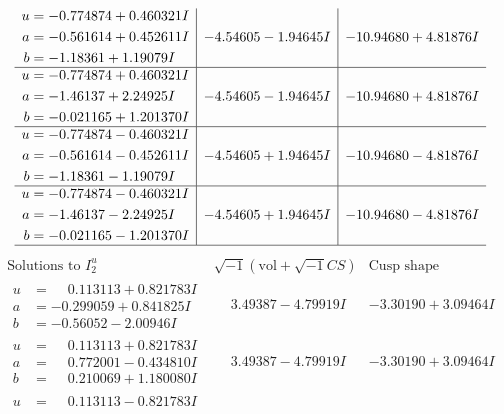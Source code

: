 \documentclass[1p]{elsarticle_modified}
\theoremstyle{definition}
\newcommand{\I}{\sqrt{-1}}
\begin{document}
$$\begin{array}{c|c|c}
\begin{aligned}
u &= -0.774874 + 0.460321 I \\
a &= -0.561614 + 0.452611 I \\
b &= -1.18361 + 1.19079 I\end{aligned}
 & -4.54605 - 1.94645 I & -10.94680 + 4.81876 I \\ \hline\begin{aligned}
u &= -0.774874 + 0.460321 I \\
a &= -1.46137 + 2.24925 I \\
b &= -0.021165 + 1.201370 I\end{aligned}
 & -4.54605 - 1.94645 I & -10.94680 + 4.81876 I \\ \hline\begin{aligned}
u &= -0.774874 - 0.460321 I \\
a &= -0.561614 - 0.452611 I \\
b &= -1.18361 - 1.19079 I\end{aligned}
 & -4.54605 + 1.94645 I & -10.94680 - 4.81876 I \\ \hline\begin{aligned}
u &= -0.774874 - 0.460321 I \\
a &= -1.46137 - 2.24925 I \\
b &= -0.021165 - 1.201370 I\end{aligned}
 & -4.54605 + 1.94645 I & -10.94680 - 4.81876 I\\
 \hline 
 \end{array}$$\newpage$$\begin{array}{c|c|c}  
\text{Solutions to }I^u_{2}& \I (\text{vol} + \sqrt{-1}CS) & \text{Cusp shape}\\
 \hline 
\begin{aligned}
u &= \phantom{-}0.113113 + 0.821783 I \\
a &= -0.299059 + 0.841825 I \\
b &= -0.56052 - 2.00946 I\end{aligned}
 & \phantom{-}3.49387 - 4.79919 I & -3.30190 + 3.09464 I \\ \hline\begin{aligned}
u &= \phantom{-}0.113113 + 0.821783 I \\
a &= \phantom{-}0.772001 - 0.434810 I \\
b &= \phantom{-}0.210069 + 1.180080 I\end{aligned}
 & \phantom{-}3.49387 - 4.79919 I & -3.30190 + 3.09464 I \\ \hline\begin{aligned}
u &= \phantom{-}0.113113 - 0.821783 I \\

\end{aligned}
\end{array}$$
\end{document}

